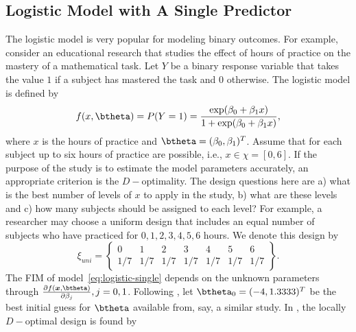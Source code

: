 \subsection{ Logistic Model with A Single Predictor}
\label{sec:logsitc-single}
The logistic model is very popular for modeling binary outcomes. For example, consider  an educational research that studies the effect of hours of practice on the mastery of a mathematical task. Let  $Y$ be a binary response variable that  takes the value $1$ if a subject  has mastered the  task and $0$ otherwise. The logistic model is defined by
\begin{equation}
\label{eq:logistic-single}
f(x, \btheta) =  P(Y=1) = \frac{\exp(\beta_0 + \beta_1 x)}{1 + \exp(\beta_0 + \beta_1  x)},
\end{equation}
where $x$ is the hours of practice and $\btheta = (\beta_0, \beta_1)^T$.   Assume that  for each subject  up to six  hours of practice are possible, i.e., $x \in \chi = [0, 6]$. If  the purpose of the study is to estimate the model parameters accurately, an appropriate criterion is the  $D-$optimality.
The design questions here are a) what is the best number of levels of $x$ to  apply in the study, b) what are these levels  and c) how many subjects  should be  assigned to each level? For example, a researcher may choose a uniform design that  includes an equal number of subjects who have practiced for $0, 1, 2, 3, 4, 5, 6$ hours. We denote this design by
\begin{equation}
\label{eq-uniform-design}
\xi_{uni} =
  \left\{
    \begin{array}{ccccccc}
    0 & 1 & 2 & 3 & 4 & 5 & 6 \\
    1/7& 1/7 & 1/7& 1/7 & 1/7 & 1/7 & 1/7
    \end{array}
    \right\}.
\end{equation}
The FIM of  model~\eqref{eq:logistic-single} depends on the unknown parameters through $\frac{\partial f(\boldsymbol{x},\btheta)}{\partial \beta_j}, j = 0, 1$.
Following \citet{bergerwong2005},  let $\btheta_0 = (-4, 1.3333)^T$ be the best initial guess for $\btheta$ available from, say, a similar study.   In , the  locally $D-$optimal design is found by
